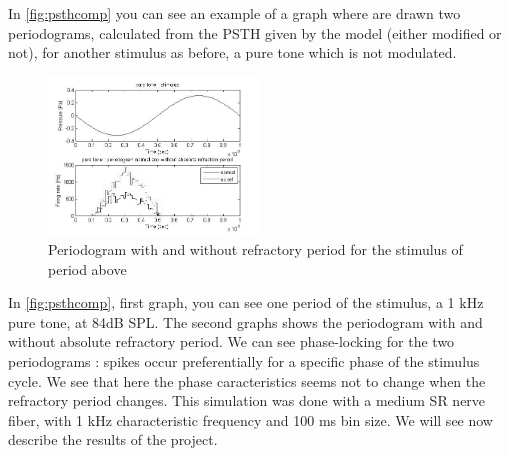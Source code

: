 In \autoref{fig:psthcomp} you can see an example of a graph
where are drawn two periodograms, calculated from the PSTH given by the model 
(either modified or not), for another stimulus as before, a pure tone
which is not modulated.


\begin{figure}[h]
	\centering
	\includegraphics[width=0.5\textwidth]{images/stim-psth-puretone-bw2.jpg}
	\caption{Periodogram with and without refractory period for the stimulus of period above}
	\label{fig:psthcomp}
\end{figure} 

In \autoref{fig:psthcomp}, first graph, you can see one period of the stimulus, 
a 1 kHz pure tone, at 84dB SPL.
The second graphs shows the periodogram with and without absolute refractory period.
We can see phase-locking for the two periodograms : spikes occur preferentially 
for a specific phase of the stimulus cycle. We see that here the phase caracteristics 
 seems not to change when the refractory period changes.
This simulation was done with a medium SR nerve fiber, 
with 1 kHz characteristic frequency and 100 ms bin size.
We will see now describe the results of the project.


